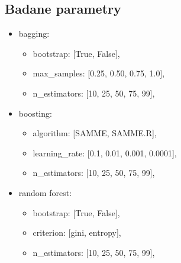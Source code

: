     \subsection{Badane parametry}
    \begin{itemize}
        \item{bagging:}
            \begin{itemize}
                \item{bootstrap: [True, False],}
                \item{max\_samples: [0.25, 0.50, 0.75, 1.0],}
                \item{n\_estimators: [10, 25, 50, 75, 99],}
            \end{itemize}

        \item{boosting:}
            \begin{itemize}
                \item{algorithm: [SAMME, SAMME.R],}
                \item{learning\_rate: [0.1, 0.01, 0.001, 0.0001],}
                \item{n\_estimators: [10, 25, 50, 75, 99],}
            \end{itemize}
        \item{random forest:}
            \begin{itemize}
                \item{bootstrap: [True, False],}
                \item{criterion: [gini, entropy],}
                \item{n\_estimators: [10, 25, 50, 75, 99],}
            \end{itemize}
    \end{itemize}

\pagebreak
